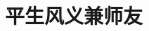 
\title{\heiti 平生风义兼师友}
\author[ ]{}   %
\renewcommand*{\Authfont}{\small\rm} %
\renewcommand*{\Affilfont}{\small\it} %
\renewcommand\Authands{ and } %
\renewcommand\Authands{ , } %
\date{} %


